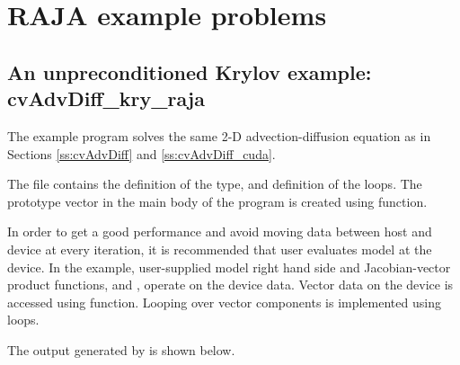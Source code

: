 \section{RAJA example problems}\label{s:ex_raja}



\subsection{An unpreconditioned Krylov example: cvAdvDiff\_kry\_raja}\label{ss:cvAdvDiff_raja}

The example program  solves the same 2-D 
advection-diffusion equation as in Sections \ref{ss:cvAdvDiff} and
\ref{ss:cvAdvDiff_cuda}.

The file  contains the definition of the {\raja}
 type, and  definition of the {\raja}
 loops. The prototype vector in the main body of the program is created
using  function. 

In order to get a good performance and avoid moving data between host
and device at every iteration, it is recommended that user evaluates  
model at the device. In the example, user-supplied model right hand side 
and Jacobian-vector product functions,  and , operate on 
the device data. Vector data on the device is accessed using 
 function. Looping over vector 
components is implemented using {\raja}  loops.

The output generated by  is shown below.



